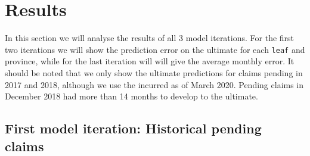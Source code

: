 \section{Results}\label{Sect_Results}
In this section we will analyse the results of all 3 model iterations. For the first two iterations we will show the prediction error on the ultimate for each \texttt{leaf} and province, while for the last iteration will will give the average monthly error. It should be noted that we only show the ultimate predictions for claims pending in 2017 and 2018, although we use the incurred as of March 2020. Pending claims in December 2018 had more than 14 months to develop to the ultimate. 
\subsection{First model iteration: Historical pending claims}

